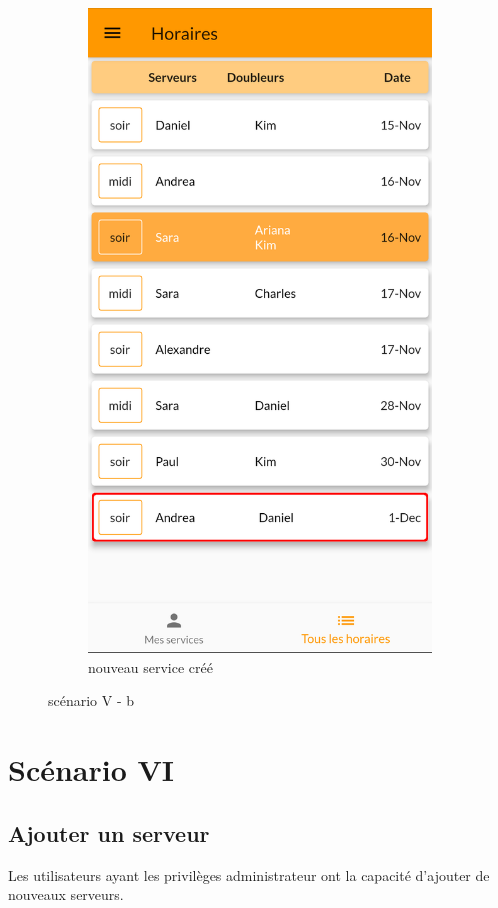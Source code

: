 \begin{center}
\begin{figure}[h]
\begin{subfigure}{.45\textwidth}
            \includegraphics[width=0.6\linewidth]{screenshots/scenario_05/ajout_service_done.png}
            \caption{nouveau service créé}
            \label{fig:ajout_service_done}
        \end{subfigure}
        \caption{scénario V - b}
        \label{fig:scen05b}
    \end{figure}
\end{center}

\section[Ajouter un serveur - Scénario VI]{Scénario VI}
    \subsection*{Ajouter un serveur}
    Les utilisateurs ayant les privilèges administrateur ont la capacité
    d'ajouter de nouveaux serveurs.

